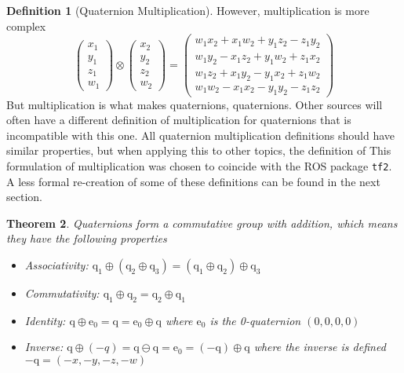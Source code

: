 \documentclass{amsart}
\newtheorem{theorem}{Theorem}[section]
\theoremstyle{definition}
\newtheorem{definition}[theorem]{Definition}
\theoremstyle{remark}
\numberwithin{equation}{section}
\begin{document}
\begin{definition}[Quaternion Multiplication]
  However, multiplication is more complex
  \begin{equation} \label{eqn:multiplication}
    \begin{pmatrix}
      x_1 \\
      y_1 \\
      z_1 \\
      w_1
    \end{pmatrix} \otimes 
    \begin{pmatrix}
      x_2 \\
      y_2 \\
      z_2 \\
      w_2
    \end{pmatrix} =
    \begin{pmatrix}
      w_1x_2 + x_1w_2 + y_1z_2 - z_1y_2 \\
      w_1y_2 - x_1z_2 + y_1w_2 + z_1x_2 \\
      w_1z_2 + x_1y_2 - y_1x_2 + z_1w_2 \\
      w_1w_2 - x_1x_2 - y_1y_2 - z_1z_2
    \end{pmatrix}
  \end{equation}
  But multiplication is what makes quaternions, quaternions. Other sources will often have a different definition of multiplication for quaternions that is incompatible with this one. All quaternion multiplication definitions should have similar properties, but when applying this to other topics, the definition of This formulation of multiplication was chosen to coincide with the ROS package \texttt{tf2}. A less formal re-creation of some of these definitions can be found in the next section.
\end{definition}

\begin{theorem}
  Quaternions form a commutative group with addition, which means they have the following properties
  \begin{itemize}
  \item Associativity: $\mathrm{q}_1\oplus(\mathrm{q}_2\oplus \mathrm{q}_3) = (\mathrm{q}_1\oplus \mathrm{q}_2) \oplus \mathrm{q}_3$
  \item Commutativity: $\mathrm{q}_1\oplus \mathrm{q}_2 = \mathrm{q}_2 \oplus \mathrm{q}_1$
  \item Identity: $\mathrm{q}\oplus \mathrm{e}_0=\mathrm{q}=\mathrm{e}_0\oplus \mathrm{q}$ where $\mathrm{e}_0$ is the 0-quaternion $(0, 0, 0, 0)$
  \item Inverse: $\mathrm{q}\oplus (-q)=\mathrm{q}\ominus \mathrm{q}=\mathrm{e}_0=(-\mathrm{q})\oplus \mathrm{q}$ where the inverse is defined $-\mathrm{q}=(-x, -y, -z, -w)$
  \end{itemize}
\end{theorem}
\end{document}
